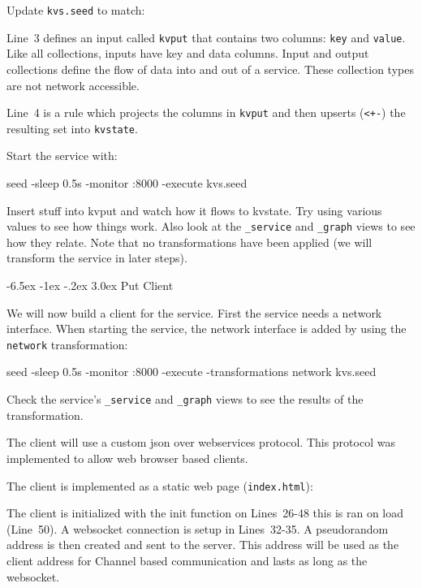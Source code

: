\documentclass[a5paper,12pt,onecolumn]{article}
\makeatletter
\def\code#1{\mbox{\lstinline{#1}}}
\renewcommand\section{\@startsection {section}{1}{\z@}%
	{-6.5ex \@plus -1ex \@minus -.2ex}%
	{3.0ex}%
	{\sf\Large}}
\makeatother
\begin{document}
Update \code{kvs.seed} to match:



Line~3 defines an input called \code{kvput} that contains two columns: \code{key} and \code{value}. Like all collections, inputs have key and data columns. Input and output collections define the flow of data into and out of a service. These collection types are not network accessible.

Line~4 is a rule which projects the columns in \code{kvput} and then upserts (\code{<+-}) the resulting set into \code{kvstate}.

Start the service with:

\begin{cli}
seed -sleep 0.5s -monitor :8000 -execute kvs.seed
\end{cli}

Insert stuff into kvput and watch how it flows to kvstate. Try using various values to see how things work. Also look at the \code{_service} and \code{_graph} views to see how they relate. Note that no transformations have been applied (we will transform the service in later steps).

\section{Put Client}

We will now build a client for the service. First the service needs a network interface. When starting the service, the network interface is added by using the \code{network} transformation:

\begin{cli}
seed -sleep 0.5s -monitor :8000 -execute -transformations network kvs.seed
\end{cli}

Check the service's \code{_service} and \code{_graph} views to see the results of the transformation.

The client will use a custom json over webservices protocol. This protocol was implemented to allow web browser based clients.

The client is implemented as a static web page (\code{index.html}):



The client is initialized with the init function on Lines~26-48 this is ran on load (Line~50). A websocket connection is setup in Lines~32-35. A pseudorandom address is then created and sent to the server. This address will be used as the client address for Channel based communication and lasts as long as the websocket.
\end{document}
